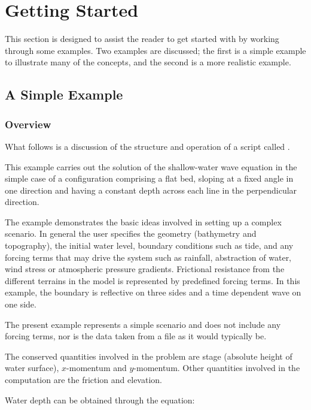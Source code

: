 \documentclass{manual}
\begin{document}

\chapter{Getting Started}
\label{ch:getstarted}

This section is designed to assist the reader to get started with
\anuga by working through some examples. Two examples are discussed;
the first is a simple example to illustrate many of the concepts, and
the second is a more realistic example.


\section{A Simple Example}
\label{sec:simpleexample}

\subsection{Overview}

What follows is a discussion of the structure and operation of a
script called .

This example carries out the solution of the shallow-water wave
equation in the simple case of a configuration comprising a flat
bed, sloping at a fixed angle in one direction and having a
constant depth across each line in the perpendicular direction.

The example demonstrates the basic ideas involved in setting up a
complex scenario. In general the user specifies the geometry
(bathymetry and topography), the initial water level, boundary
conditions such as tide, and any forcing terms that may drive the
system such as rainfall, abstraction of water, wind stress or atmospheric pressure gradients.
Frictional resistance from the different terrains in the model is
represented by predefined forcing terms. In this example, the
boundary is reflective on three sides and a time dependent wave on
one side.

The present example represents a simple scenario and does not
include any forcing terms, nor is the data taken from a file as it
would typically be.

The conserved quantities involved in the
problem are stage (absolute height of water surface),
$x$-momentum and $y$-momentum. Other quantities
involved in the computation are the friction and elevation.

Water depth can be obtained through the equation:
\end{document}
